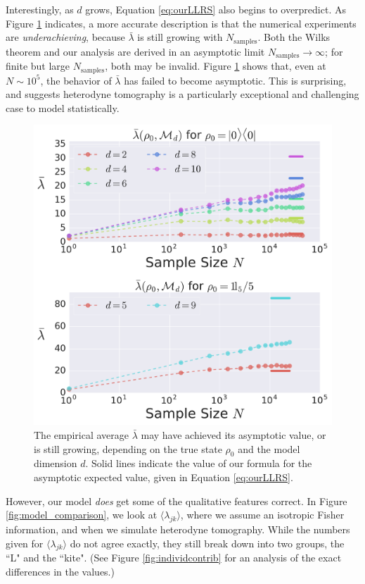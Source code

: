 \documentclass[aps,pra, twocolumn]{revtex4-1}
\begin{document}
Interestingly, as $d$ grows, Equation \eqref{eq:ourLLRS} also begins to overpredict. As Figure \ref{fig:totalcontrib} indicates, a more accurate description is that the numerical experiments are \emph{underachieving}, because $\bar\lambda$ is still growing with $N_{\mathrm{samples}}$.  Both the Wilks theorem and our analysis are derived in an asymptotic limit $N_{\mathrm{samples}} \rightarrow \infty$; for finite but large $N_{\mathrm{samples}}$, both may be invalid.  Figure \ref{fig:totalcontrib} shows that, even at $N\sim 10^{5}$, the behavior of $\bar{\lambda}$ has failed to become asymptotic. This is surprising, and suggests heterodyne tomography is a particularly exceptional and challenging case to model statistically. 

\begin{figure}[h]
  \includegraphics[width=\columnwidth]{Images/Figure_9.pdf}
 \caption{The empirical average $\bar{\lambda}$  may have achieved its asymptotic value, or is still 
growing, depending on the true state $\rho_{0}$ and the model dimension $d$. Solid lines indicate the value of our formula
for the asymptotic expected value, given in Equation \eqref{eq:ourLLRS}.}
\label{fig:totalcontrib}
\end{figure}


However, our model \emph{does} get some of the qualitative features correct. In Figure \ref{fig:model_comparison}, we look at $\langle \lambda_{jk}\rangle$, where we assume an isotropic Fisher information, and when we simulate heterodyne tomography. While the numbers given for $\langle \lambda_{jk} \rangle$ do not agree exactly, they still break down into two groups, the ``L" and the ``kite". (See Figure \ref{fig:individcontrib} for an analysis of the exact differences in the values.)
 
\end{document}
